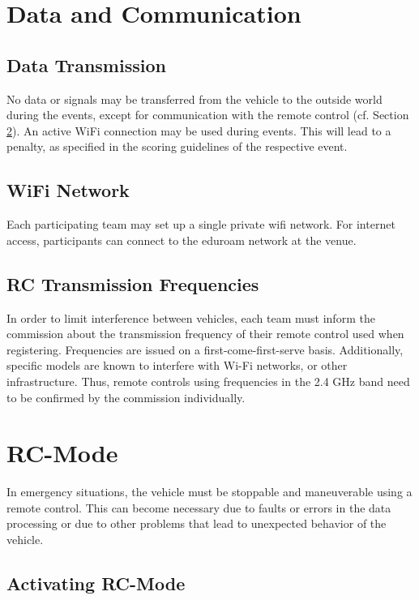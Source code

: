 \section{Data and Communication}

\subsection{Data Transmission}

No data or signals may be transferred from the vehicle to the outside world during the events, except for communication with the remote control (cf. Section \ref{rc_mode}).
An active WiFi connection may be used during events.
This will lead to a penalty, as specified in the scoring guidelines of the respective event.

\subsection{WiFi Network}

Each participating team may set up a single private wifi network.
For internet access, participants can connect to the eduroam network at the venue.

\subsection{RC Transmission Frequencies}

In order to limit interference between vehicles, each team must inform the commission about the transmission frequency of their remote control used when registering.
Frequencies are issued on a first-come-first-serve basis.
Additionally, specific models are known to interfere with Wi-Fi networks, or other infrastructure.
Thus, remote controls using frequencies in the 2.4 GHz band need to be confirmed by the commission individually.

\section{RC-Mode}
\label{rc_mode}

In emergency situations, the vehicle must be stoppable and maneuverable using a remote control.
This can become necessary due to faults or errors in the data processing or due to other problems that lead to unexpected behavior of the vehicle.

\subsection{Activating RC-Mode}


